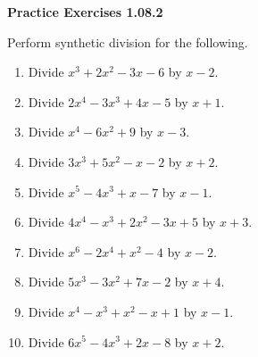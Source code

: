 \vspace{0.3ex}
\noindent\textbf{Practice Exercises 1.08.2}

\vspace{0.2ex}

Perform synthetic division for the following.
\begin{enumerate}
    \item Divide \(x^3 + 2x^2 - 3x - 6\) by \(x - 2\).
    \item Divide \(2x^4 - 3x^3 + 4x - 5\) by \(x + 1\).
    \item Divide \(x^4 - 6x^2 + 9\) by \(x - 3\).
    \item Divide \(3x^3 + 5x^2 - x - 2\) by \(x + 2\).
    \item Divide \(x^5 - 4x^3 + x - 7\) by \(x - 1\).
    \item Divide \(4x^4 - x^3 + 2x^2 - 3x + 5\) by \(x + 3\).
    \item Divide \(x^6 - 2x^4 + x^2 - 4\) by \(x - 2\).
    \item Divide \(5x^3 - 3x^2 + 7x - 2\) by \(x + 4\).
    \item Divide \(x^4 - x^3 + x^2 - x + 1\) by \(x - 1\).
    \item Divide \(6x^5 - 4x^3 + 2x - 8\) by \(x + 2\).
\end{enumerate}
